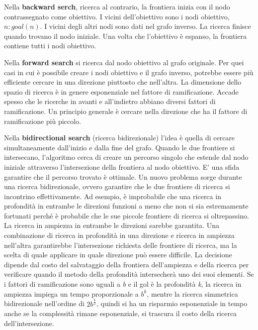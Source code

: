 \documentclass[a4paper]{extarticle}
\begin{document}
Nella \textbf{backward serch}, ricerca al contrario, la frontiera inizia con il nodo contrassegnato come obiettivo. I vicini dell'obiettivo sono i nodi obiettivo, ${n: goal(n)}$. I vicini degli altri nodi sono dati nel grafo inverso. La ricerca finisce quando trovano il nodo iniziale. Una volta che l'obiettivo è espanso, la frontiera contiene tutti i nodi obiettivo.

Nella \textbf{forward search} si ricerca dal nodo obiettivo al grafo originale. Per quei casi in cui è possibile creare i nodi obiettivo e il grafo inverso, potrebbe essere più efficiente cercare in una direzione piuttosto che nell'altra. La dimensione dello spazio di ricerca è in genere esponenziale nel fattore di ramificazione. Accade spesso che le ricerche in avanti e all'indietro abbiano diversi fattori di ramificazione. Un principio generale è cercare nella direzione che ha il fattore di ramificazione più piccolo.

Nella \textbf{bidirectional search} (ricerca bidirezionale) l'idea è quella di cercare simultaneamente dall'inizio e dalla fine del grafo. Quando le due frontiere si intersecano, l'algoritmo cerca di creare un percorso singolo che estende dal nodo iniziale attraverso l'intersezione della frontiera al nodo obiettivo. E' una sfida garantire che il percorso trovato è ottimale. Un nuovo problema sorge durante una ricerca bidirezionale, ovvero garantire che le due frontiere di ricerca si incontrino effettivamente. Ad esempio, è improbabile che una ricerca in profondità in entrambe le direzioni funzioni a meno che non si sia estremamente fortunati perché è probabile che le sue piccole frontiere di ricerca si oltrepassino. La ricerca in ampiezza in entrambe le direzioni sarebbe garantita. Una combinazione di ricerca in profondità in una direzione e ricerca in ampiezza nell'altra garantirebbe l'intersezione richiesta delle frontiere di ricerca, ma la scelta di quale applicare in quale direzione può essere difficile. La decisione dipende dal costo del salvataggio della frontiera dell'ampiezza e della ricerca per verificare quando il metodo della profondità intersecherà uno dei suoi elementi. Se i fattori di ramificazione sono uguali a \textit{b} e il gol è la profondità \textit{k}, la ricerca in ampiezza impiega un tempo proporzionale a $b^k$, mentre la ricerca simmetrica bidirezionale nell'ordine di $2b^{\frac{k}{2}}$, quindi si ha un risparmio esponenziale in tempo anche se la complessità rimane esponenziale, si trascura il costo della ricerca dell'intersezione.
\end{document}
